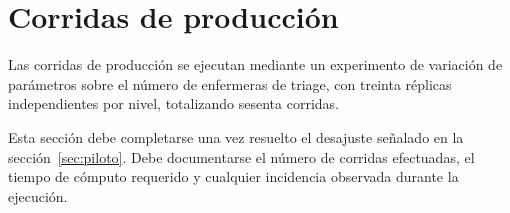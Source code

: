 \section{Corridas de producción}

Las corridas de producción se ejecutan mediante un experimento de variación
de parámetros sobre el número de enfermeras de triage, con treinta réplicas
independientes por nivel, totalizando sesenta corridas.

\begin{pendiente}
Esta sección debe completarse una vez resuelto el desajuste señalado en la
sección~\ref{sec:piloto}. Debe documentarse el número de corridas efectuadas,
el tiempo de cómputo requerido y cualquier incidencia observada durante la
ejecución.
\end{pendiente}

